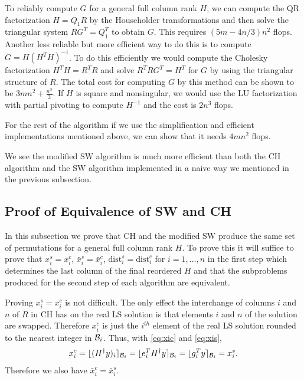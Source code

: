 \documentclass[12pt,Bold,letterpaper]{mcgilletdclass}
\newcommand{\be}{\begin{equation}}
\newcommand{\ee}{\end{equation}}
\newcommand{\dist}{\mathrm{dist}}
\newcommand{\vsp}{\vspace{\baselineskip}}
\begin{document}
To reliably compute $G$ for a general full column rank $H$,
we can compute the  QR factorization $H=Q_1R$ by the Householder transformations
and then solve the triangular system  $RG^T=Q_1^T$ to obtain $G$.
This requires $(5m-4n/3)n^2$ flops. 
Another less reliable but more efficient way to do this is to compute $G=H(H^TH)^{-1}$. 
To do this efficiently we would compute the Cholesky factorization  $H^TH = R^TR$ and solve 
$R^TRG^T = H^T$ for $G$ by using the triangular structure of $R$. 
The total cost for computing $G$ by this method can be shown to be $3mn^2+\frac{n^3}{3}$.
If $H$ is square and nonsingular, we would use the LU factorization with partial pivoting to compute $H^{-1}$
and the cost is $2n^3$ flops.

For the rest of the algorithm if we use the simplification and efficient implementations
mentioned above, we can show that it needs $4mn^2$ flops. 

We see the modified SW algorithm is much more efficient than both the CH algorithm
and the SW algorithm implemented in a naive way we mentioned in the previous subsection.

\vsp \subsection{Proof of Equivalence of SW and CH}
In this subsection we prove that  CH and  the modified  SW produce the same set of permutations
for a general full column rank $H$.
To prove this it will suffice to prove that $x_i^s = x_i^c$, $\bar{x}_i^s =\bar{x}_i^c$,
$\dist_i^s = \dist_i^c$ for $i=1, \ldots, n$ in the first step which determines the last column of the final reordered $H$
and that the subproblems produced for the second step of
each algorithm are equivalent. 

Proving $x_i^s = x_i^c$ is not difficult.
The only effect the interchange of columns $i$  and $n$ of $R$ in CH  
has on the real LS solution is that elements $i$ and $n$ of the solution are swapped.
Therefore $x_i^c$ is just the $i^{th}$ element of the real LS
solution rounded to the nearest integer in ${{\cal B}_i }$. 
Thus, with \eqref{eq:xic} and \eqref{eq:xis},
\be
x_i^c=   \lfloor (H^{\dagger}y)_i  \rceil_{{\cal B}_i }
=  \lfloor e_i^T H^{\dagger}y   \rceil_{{\cal B}_i }
=  \lfloor g_i^T  y \rceil_{{\cal B}_i } =x_i^s.
\label{eq:xics}
\ee
Therefore we also have $\bar{x}_i^c=\bar{x}_i^s$.
\end{document}
